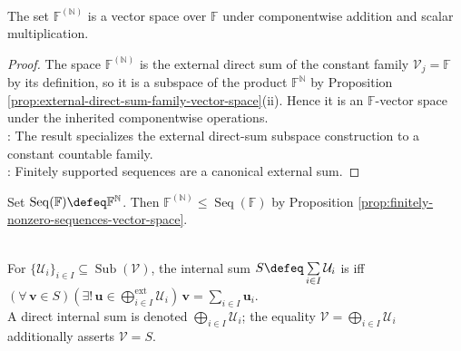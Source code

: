 \begin{proposition} \label{prop:finitely-nonzero-sequences-vector-space} \\
\leanok The set $\mathbb{F}^{(\mathbb{N})}$ is a vector space over $\mathbb{F}$ under componentwise addition and scalar multiplication.
\begin{proof}
\leanok The space $\mathbb{F}^{(\mathbb{N})}$ is the external direct sum of the constant family $\mathcal{V}_j=\mathbb{F}$ by its definition, so it is a subspace of the product $\mathbb{F}^{\mathbb{N}}$ by Proposition \ref{prop:external-direct-sum-family-vector-space}(ii). Hence it is an $\mathbb{F}$-vector space under the inherited componentwise operations.\\
: The result specializes the external direct-sum subspace construction to a constant countable family.\\
: Finitely supported sequences are a canonical external sum.
\end{proof}
\end{proposition}

Set $\operatorname{Seq}(\mathbb{F})\defeq\mathbb{F}^{\mathbb{N}}$. Then $\mathbb{F}^{(\mathbb{N})}\leq\operatorname{Seq}(\mathbb{F})$ by Proposition \ref{prop:finitely-nonzero-sequences-vector-space}.

\begin{definition} \label{def:internal-direct-sum-family} \\
For $\{\mathcal{U}_i\}_{i\in I}\subseteq\operatorname{Sub}(\mathcal{V})$, the internal sum $S\defeq\sum\limits_{i\in I}\mathcal{U}_i$ is  iff $(\forall\,\mathbf{v}\in S)(\exists!\,\mathbf{u}\in\bigoplus\limits_{i\in I}^{\mathrm{ext}}\mathcal{U}_i)\,\mathbf{v}=\sum\limits_{i\in I}\mathbf{u}_i$.\\
A direct internal sum is denoted $\bigoplus\limits_{i\in I}\mathcal{U}_i$; the equality $\mathcal{V}=\bigoplus\limits_{i\in I}\mathcal{U}_i$ additionally asserts $\mathcal{V}=S$.
\end{definition}

